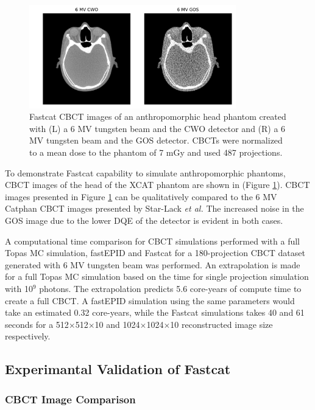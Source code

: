 \begin{figure}[h!]
   \begin{center}
   \includegraphics[width=0.8\textwidth,trim={0 0 0 0},clip]{figures/XCATs.pdf}
  \caption{
   Fastcat CBCT images of an anthropomorphic head phantom created with (L) a 6 MV tungsten beam and the CWO detector and (R) a 6 MV tungsten beam and the GOS detector. CBCTs were normalized to a mean dose to the phantom of 7 mGy and used 487 projections.
   \label{XCATs} 
    }  %
    \end{center}
\end{figure}


To demonstrate Fastcat capability to simulate anthropomorphic phantoms, CBCT images of the head of the XCAT phantom are shown in (Figure \ref{XCATs}). CBCT images presented in Figure \ref{XCATs} can be qualitatively compared to the 6 MV Catphan CBCT images presented by Star-Lack \textit{et al.}\cite{Star-Lack2015AImaging} The increased noise in the GOS image due to the lower DQE of the detector is evident in both cases.

A computational time comparison for CBCT simulations performed with a full Topas MC simulation, fastEPID and Fastcat for a 180-projection CBCT dataset generated with 6 MV tungsten beam was performed. An extrapolation is made for a full Topas MC simulation based on the time for single projection simulation with 10$^9$ photons. The extrapolation predicts 5.6 core-years of compute time to create a full CBCT. A fastEPID simulation using the same parameters would take an estimated 0.32 core-years, while the Fastcat simulations takes 40 and 61 seconds for a 512$\times$512$\times$10 and 1024$\times$1024$\times$10 reconstructed image size respectively.

\subsection{Experimantal Validation of Fastcat}
\subsubsection{CBCT Image Comparison}

